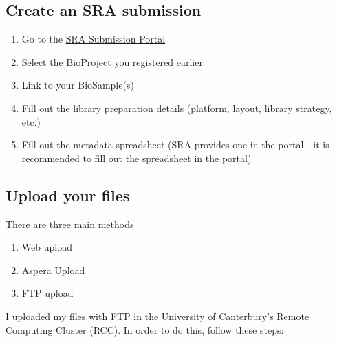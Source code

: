 \documentclass[
]{article}
\begin{document}
\hypertarget{create-an-sra-submission}{%
\subsection{Create an SRA submission}\label{create-an-sra-submission}}

\begin{enumerate}
\def\labelenumi{\arabic{enumi}.}
\item
  Go to the \href{https://submit.ncbi.nlm.nih.gov/subs/sra/}{SRA
  Submission Portal}
\item
  Select the BioProject you registered earlier
\item
  Link to your BioSample(s)
\item
  Fill out the library preparation details (platform, layout, library
  strategy, etc.)
\item
  Fill out the metadata spreadsheet (SRA provides one in the portal - it
  is recommended to fill out the spreadsheet in the portal)
\end{enumerate}

\hypertarget{upload-your-files}{%
\subsection{Upload your files}\label{upload-your-files}}

There are three main methods

\begin{enumerate}
\def\labelenumi{\arabic{enumi}.}
\item
  Web upload
\item
  Aspera Upload
\item
  FTP upload
\end{enumerate}

I uploaded my files with FTP in the University of Canterbury's Remote
Computing Cluster (RCC). In order to do this, follow these steps:
\end{document}
